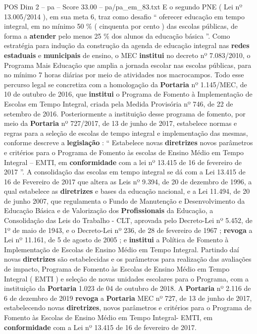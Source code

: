 \begin{textsample}{POS Dim 2 – pa – Score 33.00 – pa/pa\_em\_83.txt}
E o segundo PNE ( Lei nº 13.005/2014 ), em sua meta 6, traz como desafio “ oferecer educação em tempo integral, em no mínimo 50 \% ( cinquenta por cento ) das escolas públicas, de forma a \textbf{atender} pelo menos 25 \% dos alunos da educação básica ”.
Como estratégia para indução da construção da agenda de educação integral nas \textbf{redes} \textbf{estaduais} e \textbf{municipais} de ensino, o MEC \textbf{institui} no decreto nº 7.083/2010, o Programa Mais Educação que amplia a jornada escolar nas escolas públicas, para no mínimo 7 horas diárias por meio de atividades nos macrocampos.
Todo esse percurso legal se concretiza com a homologação da \textbf{Portaria} nº 1.145/MEC, de 10 de outubro de 2016, que \textbf{institui} o Programa de Fomento à Implementação de Escolas em Tempo Integral, criada pela Medida Provisória nº 746, de 22 de setembro de 2016.
Posteriormente a instituição desse programa de fomento, por meio da \textbf{Portaria} nº 727/2017, de 13 de junho de 2017, estabelece normas e regras para a seleção de escolas de tempo integral e implementação das mesmas, conforme descreve a \textbf{legislação} : “ Estabelece novas \textbf{diretrizes} novos parâmetros e critérios para o Programa de Fomento às escolas de Ensino Médio em Tempo Integral – EMTI, em \textbf{conformidade} com a lei nº 13.415 de 16 de fevereiro de 2017 ”.
A consolidação das escolas em tempo integral se dá com a Lei 13.415 de 16 de Fevereiro de 2017 que altera as Leis nº 9.394, de 20 de dezembro de 1996, a qual estabelece as \textbf{diretrizes} e bases da educação nacional, e a Lei 11.494, de 20 de junho 2007, que regulamenta o Fundo de Manutenção e Desenvolvimento da Educação Básica e de Valorização dos \textbf{Profissionais} da Educação, a Consolidação das Leis do Trabalho - CLT, aprovada pelo Decreto-Lei nº 5.452, de 1º de maio de 1943, e o Decreto-Lei nº 236, de 28 de fevereiro de 1967 ; \textbf{revoga} a Lei nº 11.161, de 5 de agosto de 2005 ; e \textbf{institui} a Política de Fomento à Implementação de Escolas de Ensino Médio em Tempo Integral.
Partindo daí novas \textbf{diretrizes} são estabelecidas e os parâmetros para realização das avaliações de impacto, Programa de Fomento às Escolas de Ensino Médio em Tempo Integral ( EMTI ) e seleção de novas unidades escolares para o Programa, com a instituição da \textbf{Portaria} 1.023 de 04 de outubro de 2018.
A \textbf{Portaria} nº 2.116 de 6 de dezembro de 2019 \textbf{revoga} a \textbf{Portaria} MEC nº 727, de 13 de junho de 2017, estabelecendo novas \textbf{diretrizes}, novos parâmetros e critérios para o Programa de Fomento às Escolas de Ensino Médio em Tempo Integral- EMTI, em \textbf{conformidade} com a Lei nº 13.415 de 16 de fevereiro de 2017.

\end{textsample}
